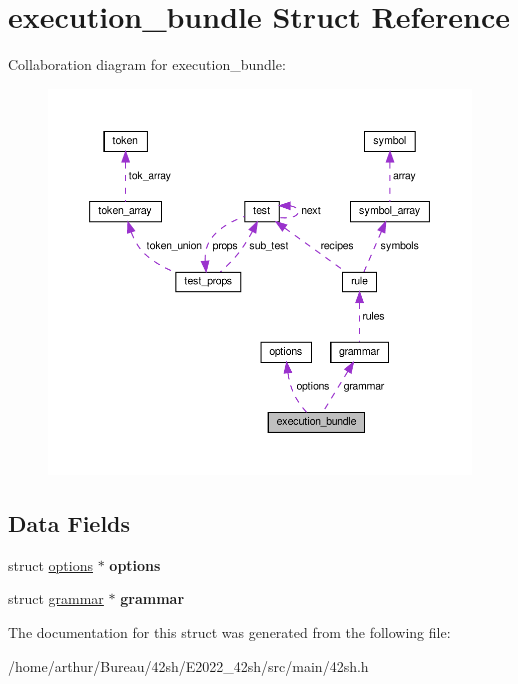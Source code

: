 \hypertarget{structexecution__bundle}{}\section{execution\+\_\+bundle Struct Reference}
\label{structexecution__bundle}


Collaboration diagram for execution\+\_\+bundle\+:
\nopagebreak
\begin{figure}[H]
\begin{center}
\leavevmode
\includegraphics[width=350pt]{structexecution__bundle__coll__graph}
\end{center}
\end{figure}
\subsection*{Data Fields}
\begin{DoxyCompactItemize}
\item 
\mbox{\label{structexecution__bundle_a166f2726234a01848aacfb3760d35ea0}} 
struct \hyperlink{structoptions}{options} $\ast$ {\bfseries options}
\item 
\mbox{\label{structexecution__bundle_afda8f0b1c72578dde7de0b265ab07efc}} 
struct \hyperlink{structgrammar}{grammar} $\ast$ {\bfseries grammar}
\end{DoxyCompactItemize}


The documentation for this struct was generated from the following file\+:\begin{DoxyCompactItemize}
\item 
/home/arthur/\+Bureau/42sh/\+E2022\+\_\+42sh/src/main/42sh.\+h\end{DoxyCompactItemize}
